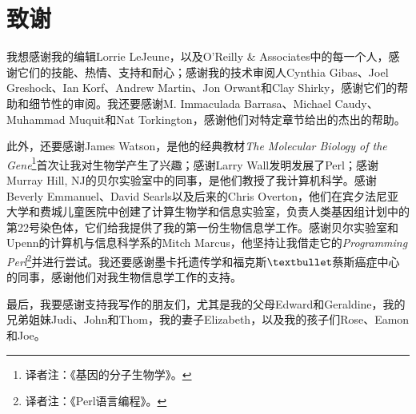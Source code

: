 \section*{致谢}
我想感谢我的编辑Lorrie LeJeune，以及O'Reilly \& Associates中的每一个人，感谢它们的技能、热情、支持和耐心；感谢我的技术审阅人Cynthia Gibas、Joel Greshock、Ian Korf、Andrew Martin、Jon Orwant和Clay Shirky，感谢它们的帮助和细节性的审阅。我还要感谢M. Immaculada Barrasa、Michael Caudy、Muhammad Muquit和Nat Torkington，感谢他们对特定章节给出的杰出的帮助。

此外，还要感谢James Watson，是他的经典教材\textit{The Molecular Biology of the Gene}\footnote{译者注：《基因的分子生物学》。}首次让我对生物学产生了兴趣；感谢Larry Wall发明发展了Perl；感谢Murray Hill, NJ的贝尔实验室中的同事，是他们教授了我计算机科学。感谢Beverly Emmanuel、David Searls以及后来的Chris Overton，他们在宾夕法尼亚大学和费城儿童医院中创建了计算生物学和信息实验室，负责人类基因组计划中的第22号染色体，它们给我提供了我的第一份生物信息学工作。感谢贝尔实验室和Upenn的计算机与信息科学系的Mitch Marcus，他坚持让我借走它的\textit{Programming Perl}\footnote{译者注：《Perl语言编程》。}并进行尝试。我还要感谢墨卡托遗传学和福克斯$\textbullet$蔡斯癌症中心的同事，感谢他们对我生物信息学工作的支持。 

最后，我要感谢支持我写作的朋友们，尤其是我的父母Edward和Geraldine，我的兄弟姐妹Judi、John和Thom，我的妻子Elizabeth，以及我的孩子们Rose、Eamon和Joe。

\clearpage
\thispagestyle{empty}
